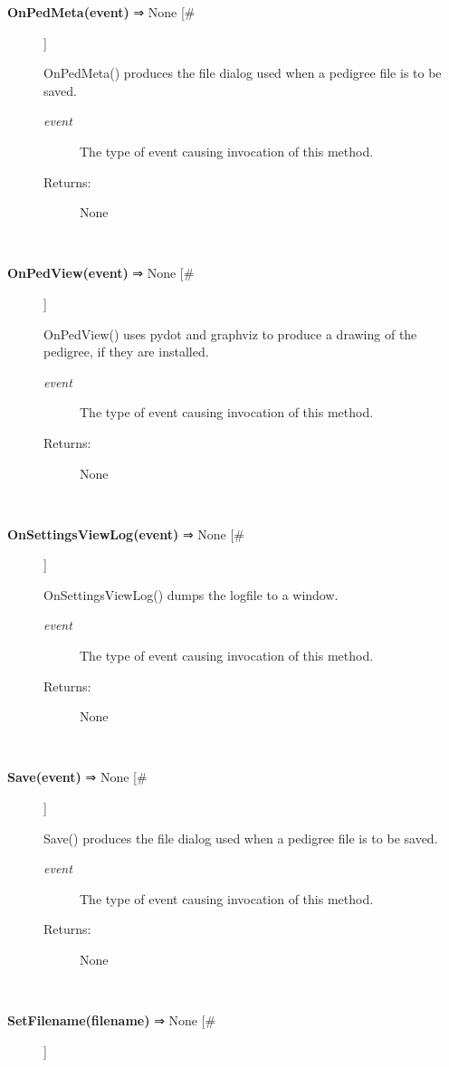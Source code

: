 \documentclass[10pt]{article}
\begin{document}
\begin{description}
\item[\textbf{OnPedMeta(event)}
 ⇒ None [\#]]

 OnPedMeta() produces the file dialog used when a pedigree file is to be saved.
\begin{description}
\item[\emph{event}
] The type of event causing invocation of this method.
\item[Returns:] None

\end{description}
\\ 

\item[\textbf{OnPedView(event)}
 ⇒ None [\#]]

 OnPedView() uses pydot and graphviz to produce a drawing of the pedigree, if they are installed.
\begin{description}
\item[\emph{event}
] The type of event causing invocation of this method.
\item[Returns:] None

\end{description}
\\ 

\item[\textbf{OnSettingsViewLog(event)}
 ⇒ None [\#]]

 OnSettingsViewLog() dumps the logfile to a window.
\begin{description}
\item[\emph{event}
] The type of event causing invocation of this method.
\item[Returns:] None

\end{description}
\\ 

\item[\textbf{Save(event)}
 ⇒ None [\#]]

 Save() produces the file dialog used when a pedigree file is to be saved.
\begin{description}
\item[\emph{event}
] The type of event causing invocation of this method.
\item[Returns:] None

\end{description}
\\ 

\item[\textbf{SetFilename(filename)}
 ⇒ None [\#]]


\end{description}
\end{document}
